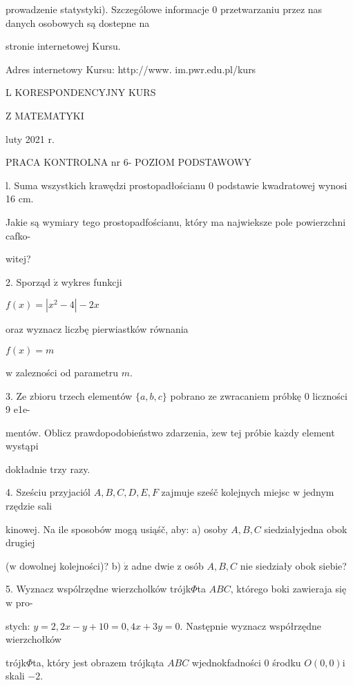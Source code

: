 \documentclass[a4paper,12pt]{article}
\begin{document}
prowadzenie statystyki). Szczególowe informacje $0$ przetwarzaniu przez nas danych osobowych są dostepne na

stronie internetowej Kursu.

Adres internetowy Kursu: http://www. im.pwr.edu.pl/kurs







L KORESPONDENCYJNY KURS

Z MATEMATYKI

luty 2021 r.

PRACA KONTROLNA nr 6- POZIOM PODSTAWOWY

l. Suma wszystkich krawędzi prostopadłościanu $0$ podstawie kwadratowej wynosi 16 cm.

Jakie są wymiary tego prostopadfościanu, który ma najwieksze pole powierzchni cafko-

witej?

2. Sporząd $\acute{\mathrm{z}}$ wykres funkcji

$f(x)=|x^{2}-4|-2x$

oraz wyznacz liczbę pierwiastków równania

$f(x)=m$

$\mathrm{w}$ zalezności od parametru $m.$

3. Ze zbioru trzech elementów $\{a,b,c\}$ pobrano ze zwracaniem próbkę $0$ liczności 9 e1e-

mentów. Oblicz prawdopodobieństwo zdarzenia, $\dot{\mathrm{z}}\mathrm{e}\mathrm{w}$ tej próbie $\mathrm{k}\mathrm{a}\dot{\mathrm{z}}\mathrm{d}\mathrm{y}$ element wystąpi

dokładnie trzy razy.

4. Sześciu przyjaciól $A, B, C, D, E, F$ zajmuje sześč kolejnych miejsc $\mathrm{w}$ jednym rzędzie sali

kinowej. Na ile sposobów mogą usiąśč, aby: a) osoby $A, B, C$ siedziałyjedna obok drugiej

($\mathrm{w}$ dowolnej kolejności)? b) $\dot{\mathrm{z}}$ adne dwie $\mathrm{z}$ osób $A, B, C$ nie siedziały obok siebie?

5. Wyznacz wspólrzędne wierzcholków trójk$\Phi$ta $ABC$, którego boki zawieraja się $\mathrm{w}$ pro-

stych: $y=2, 2x-y+10=0, 4x+3y=0$. Następnie wyznacz współrzędne wierzchołków

trójk$\Phi$ta, który jest obrazem trójkąta $ABC$ wjednokfadności $0$ środku $O(0,0)\mathrm{i}$ skali $-2.$
\end{document}
